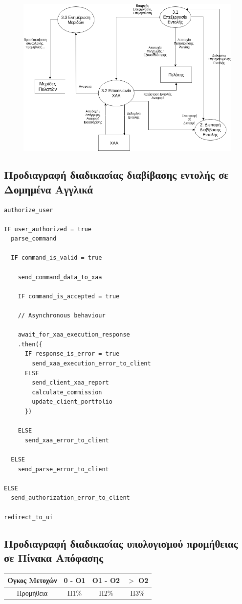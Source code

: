 \documentclass{article}
\begin{document}
	\begin{figure}[!h]
		\includegraphics[width=\linewidth]{../Structured_Analysis/Level_2_Diagram.png}
	\end{figure}

\newpage
\subsection{Προδιαγραφή διαδικασίας διαβίβασης εντολής σε Δομημένα Αγγλικά}
\begin{lstlisting}
authorize_user

IF user_authorized = true
  parse_command

  IF command_is_valid = true

	send_command_data_to_xaa

	IF command_is_accepted = true

	// Asynchronous behaviour

	await_for_xaa_execution_response
	.then({
	  IF response_is_error = true
	  	send_xaa_execution_error_to_client
	  ELSE
	  	send_client_xaa_report
	  	calculate_commission
	  	update_client_portfolio
	  })

	ELSE
	  send_xaa_error_to_client

  ELSE
    send_parse_error_to_client

ELSE
  send_authorization_error_to_client

redirect_to_ui

\end{lstlisting}

\newpage
\subsection{Προδιαγραφή διαδικασίας υπολογισμού προμήθειας σε Πίνακα Απόφασης}
\begin{center}
\addtolength\tabcolsep{5pt}
\begin{tabular}{ ||c|ccc|| } 
	 \hline
	 Όγκος Μετοχών & 0 - O1 & O1 - O2 & $>$ O2 \\
	 \hline
	 Προμήθεια & Π1\% & Π2\% & Π3\%\\  
	 \hline
\end{tabular}
\end{center}
\end{document}
